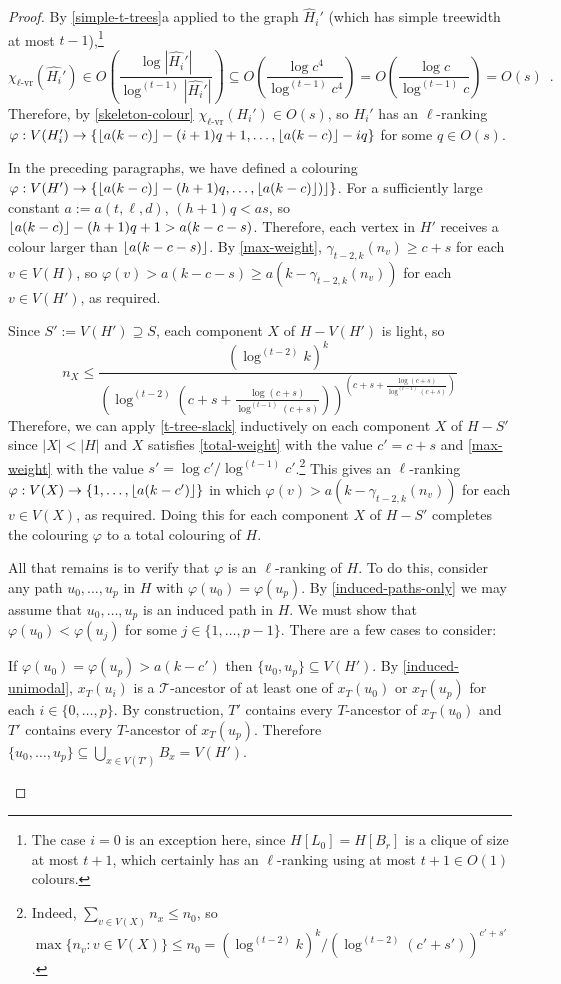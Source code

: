 \documentclass[kpfonts]{patmorin}
\newcommand{\rn}[1]{\chi_{\operatorname{#1-vr}}}
\newcommand{\lrn}{\rn{\ell}}
\theoremstyle{named}
\newcommand{\weirdref}[2]{\cref{#1}#2}
\begin{document}
\begin{proof}
    By \weirdref{simple-t-trees}{a} applied to the graph $\hat{H}_i'$ (which has simple treewidth at most $t-1$),\footnote{The case $i=0$ is an exception here, since $H[L_0]=H[B_r]$ is a clique of size at most $t+1$, which certainly has an $\ell$-ranking using at most $t+1\in O(1)$ colours.}
    \[
       \lrn(\hat{H_i}')\in
       O\left(\frac{\log|\hat{H_i}'|}{\log^{(t-1)}|\hat{H_i}'|}\right)
       \subseteq O\left(\frac{\log c^4}{\log^{(t-1)} c^4}\right)
       = O\left(\frac{\log c}{\log^{(t-1)} c}\right)
       = O(s) \enspace .
    \]
    Therefore, by \cref{skeleton-colour} $\lrn(H_i')\in O(s)$, so
    $H_i'$ has an $\ell$-ranking $\varphi:V(H_i')\to \{{\lfloor a(k-c) \rfloor}-(i+1)q+1,\ldots,\lfloor a(k-c)\rfloor-iq\}$ for some $q\in O(s)$.

    In the preceding paragraphs, we have defined a colouring $\varphi: V(H')\to \{{\lfloor a(k-c) \rfloor}-(h+1)q,\ldots,{\lfloor a(k-c) \rfloor})\rfloor\}$. For a sufficiently large constant $a:=a(t,\ell,d)$, $(h+1)q < as$, so ${\lfloor a(k-c) \rfloor}-(h+1)q+1 > a(k-c-s)$. Therefore, each vertex in $H'$ receives a colour larger than ${\lfloor a(k-c-s) \rfloor}$. By \cref{max-weight}, $\gamma_{t-2,k}(n_v)\ge c+s$ for each $v\in V(H)$, so $\varphi(v)>a(k-c-s) \ge a(k-\gamma_{t-2,k}(n_v))$ for each $v\in V(H')$, as required.

    Since $S':=V(H')\supseteq S$, each component $X$ of $H-V(H')$ is light, so
    \[
       n_{X} \le \frac{(\log^{(t-2)} k)^k}{
        \left(
            \log^{(t-2)}
                \left(
                   c+s+\tfrac{\log(c+s)}{\log^{(t-1)}(c+s)}
               \right)
        \right)^{\left(
           c+s+\tfrac{\log(c+s)}{\log^{(t-1)}(c+s)}
       \right)}
       }
   \]
   Therefore, we can apply \cref{t-tree-slack} inductively on each component $X$ of $H-S'$ since $|X|<|H|$ and $X$ satisfies \cref{total-weight} with the value $c'=c+s$ and \cref{max-weight} with the value $s'=\log c'/\log^{(t-1)} c'$.\footnote{Indeed, $\sum_{v\in V(X)} n_x\le n_0$, so $\max\{n_v:v\in V(X)\}\le n_0= (\log^{(t-2)} k)^k/(\log^{(t-2)}(c'+s'))^{c'+s'}$.}  This gives an $\ell$-ranking $\varphi:V(X)\to\{1,\ldots,{\lfloor a(k-c') \rfloor}\}$ in which $\varphi(v)> a(k-\gamma_{t-2,k}(n_v))$ for each $v\in V(X)$, as required.   Doing this for each component $X$ of $H-S'$ completes the colouring $\varphi$ to a total colouring of $H$.

   All that remains is to verify that $\varphi$ is an $\ell$-ranking of $H$. To do this, consider any path $u_0,\ldots,u_p$ in $H$ with $\varphi(u_0)=\varphi(u_p)$.  By \cref{induced-paths-only} we may assume that $u_0,\ldots,u_p$ is an induced path in $H$.  We must show that $\varphi(u_0)<\varphi(u_j)$ for some $j\in\{1,\ldots,p-1\}$. There are a few cases to consider:
   \begin{compactenum}
        \item If $\varphi(u_0)=\varphi(u_p) > a(k-c')$ then $\{u_0,u_p\}\subseteq V(H')$.  By \cref{induced-unimodal}, $x_T(u_i)$ is a $\mathcal{T}$-ancestor of at least one of $x_T(u_0)$ or $x_T(u_p)$ for each $i\in\{0,\ldots,p\}$.  By construction, $T'$ contains every $T$-ancestor of $x_T(u_0)$ and $T'$ contains every $T$-ancestor of $x_T(u_p)$.  Therefore $\{u_0,\ldots,u_p\}\subseteq \bigcup_{x\in V(T')} B_x=V(H')$.


\end{compactenum}
\end{proof}
\end{document}
